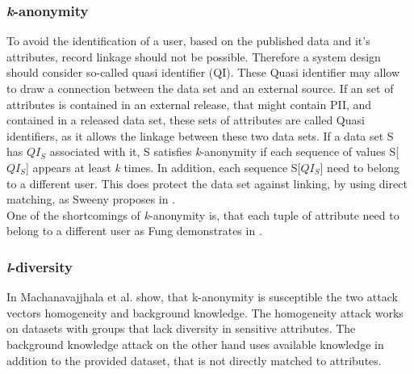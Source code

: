         \subsubsection{\textit{k}-anonymity}
            \label{subsec:related:kanon}
            To avoid the identification of a user, based on the published data and it's attributes, record linkage should not be possible. Therefore a system design should consider so-called quasi identifier (QI). These Quasi identifier may allow to draw a connection between the data set and an external source\cite{sweeney_k-anonymity_2002}.
            If an set of attributes is contained in an external release, that might contain PII, and contained in a released data set, these sets of attributes are called Quasi identifiers, as it allows the linkage between these two data sets.
            If a data set S has $QI_S$ associated with it, S satisfies \textit{k}-anonymity if each sequence of values S[$QI_S$] appears at least \textit{k} times. 
        	In addition, each sequence S[$QI_S$] need to belong to a different user.
        	This does protect the data set against linking, by using direct matching, as Sweeny proposes in \cite{sweeney_k-anonymity_2002}.\\
            
            One of the shortcomings of \textit{k}-anonymity is, that each tuple of attribute need to belong to a different user as Fung demonstrates in \cite{fung_introduction_2011}.

        \subsubsection{\textit{l}-diversity}
            \label{subsec:related:l-div}
            In \cite{machanavajjhala_l-diversity_2007} Machanavajjhala et al. show, that k-anonymity is susceptible the two attack vectors homogeneity and background knowledge.
            The homogeneity attack works on datasets with groups that lack diversity in sensitive attributes. The background knowledge attack on the other hand uses available knowledge in addition to the provided dataset, that is not directly matched to attributes.\\
            

